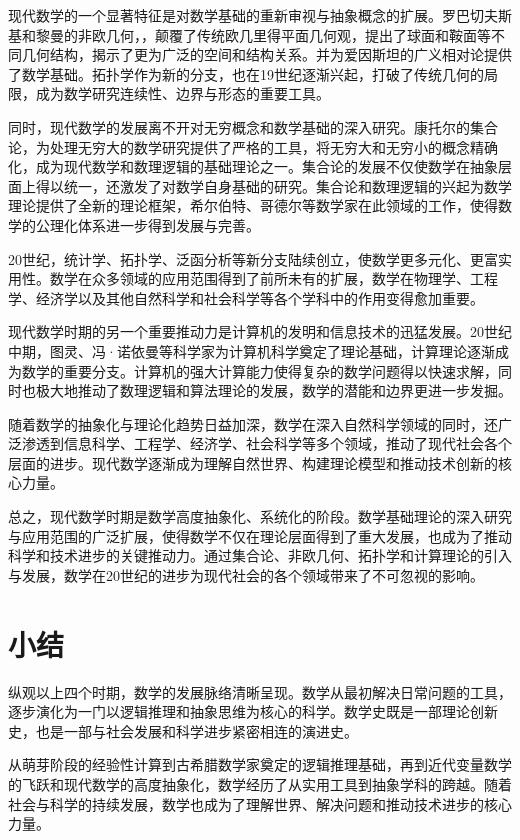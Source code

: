 现代数学的一个显著特征是对数学基础的重新审视与抽象概念的扩展。罗巴切夫斯基和黎曼的非欧几何，，颠覆了传统欧几里得平面几何观，提出了球面和鞍面等不同几何结构，揭示了更为广泛的空间和结构关系。并为爱因斯坦的广义相对论提供了数学基础。拓扑学作为新的分支，也在19世纪逐渐兴起，打破了传统几何的局限，成为数学研究连续性、边界与形态的重要工具。

同时，现代数学的发展离不开对无穷概念和数学基础的深入研究。康托尔的集合论，为处理无穷大的数学研究提供了严格的工具，将无穷大和无穷小的概念精确化，成为现代数学和数理逻辑的基础理论之一。集合论的发展不仅使数学在抽象层面上得以统一，还激发了对数学自身基础的研究。集合论和数理逻辑的兴起为数学理论提供了全新的理论框架，希尔伯特、哥德尔等数学家在此领域的工作，使得数学的公理化体系进一步得到发展与完善。

20世纪，统计学、拓扑学、泛函分析等新分支陆续创立，使数学更多元化、更富实用性。数学在众多领域的应用范围得到了前所未有的扩展，数学在物理学、工程学、经济学以及其他自然科学和社会科学等各个学科中的作用变得愈加重要。

现代数学时期的另一个重要推动力是计算机的发明和信息技术的迅猛发展。20世纪中期，图灵、冯·诺依曼等科学家为计算机科学奠定了理论基础，计算理论逐渐成为数学的重要分支。计算机的强大计算能力使得复杂的数学问题得以快速求解，同时也极大地推动了数理逻辑和算法理论的发展，数学的潜能和边界更进一步发掘。

随着数学的抽象化与理论化趋势日益加深，数学在深入自然科学领域的同时，还广泛渗透到信息科学、工程学、经济学、社会科学等多个领域，推动了现代社会各个层面的进步。现代数学逐渐成为理解自然世界、构建理论模型和推动技术创新的核心力量。

总之，现代数学时期是数学高度抽象化、系统化的阶段。数学基础理论的深入研究与应用范围的广泛扩展，使得数学不仅在理论层面得到了重大发展，也成为了推动科学和技术进步的关键推动力。通过集合论、非欧几何、拓扑学和计算理论的引入与发展，数学在20世纪的进步为现代社会的各个领域带来了不可忽视的影响。
\section{小结}
纵观以上四个时期，数学的发展脉络清晰呈现。数学从最初解决日常问题的工具，逐步演化为一门以逻辑推理和抽象思维为核心的科学。数学史既是一部理论创新史，也是一部与社会发展和科学进步紧密相连的演进史。

从萌芽阶段的经验性计算到古希腊数学家奠定的逻辑推理基础，再到近代变量数学的飞跃和现代数学的高度抽象化，数学经历了从实用工具到抽象学科的跨越。随着社会与科学的持续发展，数学也成为了理解世界、解决问题和推动技术进步的核心力量。


\nocite{*}
\printbibliography[heading=bibintoc, title=\ebibname]
\appendix

\newpage
